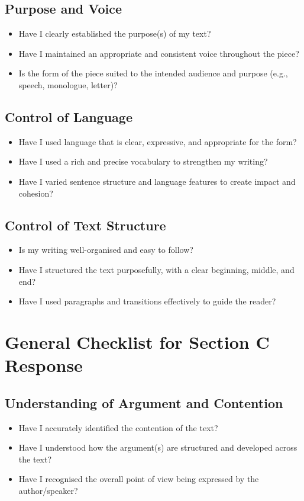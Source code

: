 \documentclass[a4paper]{article}
\begin{document}
\subsection*{Purpose and Voice}
\begin{itemize}
  \item Have I clearly established the purpose(s) of my text?
  \item Have I maintained an appropriate and consistent voice throughout the piece?
  \item Is the form of the piece suited to the intended audience and purpose (e.g., speech, monologue, letter)?
\end{itemize}

\subsection*{Control of Language}
\begin{itemize}
  \item Have I used language that is clear, expressive, and appropriate for the form?
  \item Have I used a rich and precise vocabulary to strengthen my writing?
  \item Have I varied sentence structure and language features to create impact and cohesion?
\end{itemize}

\subsection*{Control of Text Structure}
\begin{itemize}
  \item Is my writing well-organised and easy to follow?
  \item Have I structured the text purposefully, with a clear beginning, middle, and end?
  \item Have I used paragraphs and transitions effectively to guide the reader?
\end{itemize}

\newpage
\section*{General Checklist for Section C Response}

\subsection*{Understanding of Argument and Contention}
\begin{itemize}
  \item Have I accurately identified the contention of the text?
  \item Have I understood how the argument(s) are structured and developed across the text?
  \item Have I recognised the overall point of view being expressed by the author/speaker?
\end{itemize}
\end{document}
